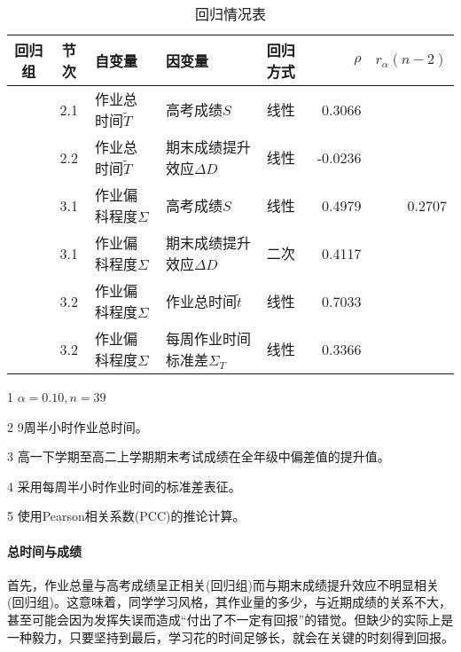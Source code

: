 \documentclass{article}
\begin{document}
\begin{CJK}{UTF8}{song}
\begin{table}[tbp]
\caption{回归情况表}
\begin{center}
\begin{threeparttable}[b]
\begin{tabular}{cclllrr}
  \toprule
  回归组 & 节次  & 自变量 & 因变量 & 回归方式 & $\rho$ & $r_{\alpha}(n-2)$\tnote{[1]} \\
  \midrule
  \uppercase\expandafter{\romannumeral1} & 2.1 & 作业总时间$\tilde{T}$\tnote{[2]} & 高考成绩$S$ & 线性 & 0.3066 & \\
  \uppercase\expandafter{\romannumeral2} & 2.2 & 作业总时间$\tilde{T}$ & 期末成绩提升效应$\Delta D$\tnote{[3]} & 线性 & -0.0236 & \\
  \uppercase\expandafter{\romannumeral3} & 3.1 & 作业偏科程度$\Sigma$\tnote{[4]} & 高考成绩$S$ & 线性  &0.4979 & 0.2707\\
  \uppercase\expandafter{\romannumeral4} & 3.1 & 作业偏科程度$\Sigma$ & 期末成绩提升效应$\Delta D$ & 二次\tnote{[5]}  & 0.4117 & \\
  \uppercase\expandafter{\romannumeral5} & 3.2 & 作业偏科程度$\Sigma$ & 作业总时间$\tilde{t}$ & 线性 & 0.7033 & \\
  \uppercase\expandafter{\romannumeral6} & 3.2 & 作业偏科程度$\Sigma$ & 每周作业时间标准差$\Sigma_T$ & 线性 & 0.3366 & \\
  \bottomrule
  \end{tabular}
  \begin{tablenotes}
  \item[1] $\alpha = 0.10, n = 39$
  \item[2] 9周半小时作业总时间。
  \item[3] 高一下学期至高二上学期期末考试成绩在全年级中偏差值的提升值。
  \item[4] 采用每周半小时作业时间的标准差表征。
  \item[5] 使用Pearson相关系数(PCC)的推论计算。
  \end{tablenotes}
\end{threeparttable}
\end{center}
\end{table}

\paragraph{总时间与成绩}
首先，作业总量与高考成绩呈正相关(回归组\uppercase\expandafter{})而与期末成绩提升效应不明显相关(回归组\uppercase\expandafter{})。这意味着，同学学习风格，其作业量的多少，与近期成绩的关系不大，甚至可能会因为发挥失误而造成“付出了不一定有回报”的错觉。但缺少的实际上是一种毅力，只要坚持到最后，学习花的时间足够长，就会在关键的时刻得到回报。


\end{CJK}
\end{document}
